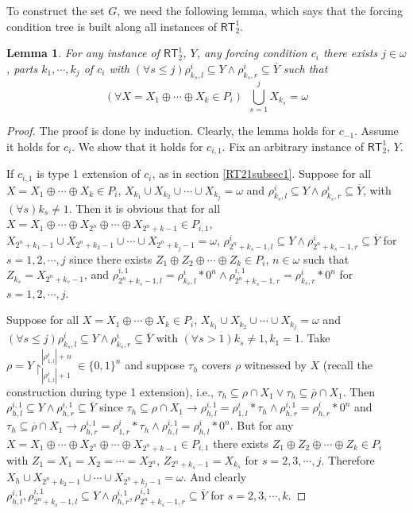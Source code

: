 \documentclass[options]{amsart}
\newtheorem{lemma}[theorem]{Lemma}
\theoremstyle{definition}
\theoremstyle{remark}
\newtheorem{Ramsey's theorem}[theorem]{Ramsey's theorem}
\begin{document}
To construct the set $G$, we need the following
lemma, which says that the forcing condition
tree is built along all
instances of $\mathsf{RT}_2^1$.
\begin{lemma}\label{RT21lem2}
For any instance of $\mathsf{RT}^1_2$,
$Y$, any forcing condition
$c_i$ there exists
$j\in \omega$,
parts $k_1,\cdots,k_{j}$
of $c_i$
with
$(\forall s\leq j)\rho^i_{k_s,l}
\subseteq Y\wedge
\rho^i_{k_s,r}
\subseteq \overline{Y}$
such that
\[
(\forall X=X_1\oplus \cdots\oplus
X_k\in P_i)\ \
\bigcup\limits_{s=1}^j
X_{k_s}=\omega
\]

\end{lemma}
\begin{proof}
The proof is done by
induction.
Clearly, the lemma holds
for $c_{-1}$.
Assume it holds for
$c_i$.
We show that it holds
for $c_{i,1}$.
Fix an arbitrary instance
of $\mathsf{RT}_2^1$, $Y$.

If $c_{i,1}$ is type 1 extension
of $c_i$, as in section
\ref{RT21subsec1}.
Suppose
for all
$X = X_1\oplus\cdots\oplus X_k
\in P_i$,
$X_{k_1}\cup X_{k_2}\cup\cdots
\cup X_{k_j}=\omega$ and
$\rho^i_{k_s,l}\subseteq
Y\wedge \rho^i_{k_s,r}\subseteq
\overline{Y}$, with
$(\forall s)k_s\neq 1$.
Then it is obvious that
for all $X=X_1\oplus
\cdots\oplus X_{2^n}\oplus \cdots\oplus
X_{2^n+ k-1}\in P_{i,1}$,
$X_{2^n+k_1-1}\cup
X_{2^n+k_2-1}\cup\cdots
\cup X_{2^n+k_j-1}=\omega$,
$\rho^i_{2^n+k_s-1,l}
\subseteq Y\wedge
\rho^i_{2^n+k_s-1,r}
\subseteq \overline{Y}$
for $s=1,2,\cdots,j$ since
there exists $Z_1\oplus Z_2\oplus
\cdots\oplus Z_k\in P_i$, $n\in\omega$
 such that
$Z_{k_s} =X_{2^n+k_s-1}$,
and $\rho^{i,1}_{2^n+k_s-1,l}=
\rho^{i}_{k_s,l}*0^n\wedge
\rho^{i,1}_{2^n+k_s-1,r}
=\rho^i_{k_s,r}*0^n$
for $s=1,2,\cdots,j$.

Suppose
for all
$X = X_1\oplus\cdots\oplus X_k
\in P_i$,
$X_{k_1}\cup X_{k_2}\cup\cdots
\cup X_{k_j}=\omega$ and
$(\forall s\leq j)\rho^i_{k_s,l}\subseteq
Y\wedge \rho^i_{k_s,r}\subseteq
\overline{Y}$ with
$(\forall s>1)k_s\neq 1, k_1=1$.
Take $\rho = Y\upharpoonright_{|\rho^i_{1,l}|+1}^
{|\rho^i_{1,l}|+n}\in \{0,1\}^n$ and
suppose $\tau_h$ covers $\rho$ witnessed by $X$
(recall the construction during type 1 extension),
i.e., $\tau_h\subseteq \rho\cap X_1\vee
\tau_h\subseteq \overline{\rho}\cap X_1$.
Then
 $\rho^{i,1}_{h,l}\subseteq
Y\wedge \rho^{i,1}_{h,r}\subseteq \overline{Y}$
since $\tau_h\subseteq \rho\cap X_1
\rightarrow
\rho^{i,1}_{h,l}
=\rho^i_{1,l}*\tau_h\wedge\rho^{i,1}_{h,r}
=\rho^{i}_{h,r}*0^n $
and
$\tau_h\subseteq \overline{\rho}\cap X_1
\rightarrow
\rho^{i,1}_{h,r}
=\rho^i_{1,r}*\tau_h\wedge\rho^{i,1}_{h,l}
=\rho^{i}_{h,l}*0^n $.
But
for any  $X= X_1\oplus\cdots\oplus
X_{2^n}\oplus\cdots\oplus
X_{2^n+k-1}\in P_{i,1}$
there exists
$Z_1\oplus Z_2\oplus
\cdots\oplus Z_k\in P_i$ with
$Z_1=X_1=X_2=\cdots=
X_{2^n}$,
$Z_{2^n+k_s-1}=X_{k_s}$
for $s=2,3,\cdots,j$. Therefore
$X_h
\cup X_{2^n+k_2-1}\cup
\cdots\cup X_{2^n+k_j-1}=\omega$.
And clearly
$
\rho^{i,1}_{h,l},
\rho^{i,1}_{2^n+k_s-1,l}
\subseteq Y\wedge
\rho^{i,1}_{h,r},
\rho^{i,1}_{2^n+k_s-1,r}
\subseteq \overline{Y}$
for $s=2,3,\cdots,k$.


\end{proof}
\end{document}
